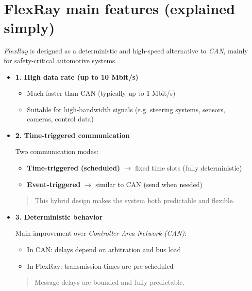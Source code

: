 \clearpage


\section{FlexRay main features (explained simply)}
\textit{FlexRay} is designed as a deterministic and high-speed alternative to \textit{CAN}, mainly for safety-critical automotive systems.

\begin{itemize}

\item \textbf{1. High data rate (up to 10 Mbit/s)}

\begin{itemize}
    \item Much faster than CAN (typically up to 1 Mbit/s)
    \item Suitable for high-bandwidth signals (e.g. steering systems, sensors, cameras, control data)
\end{itemize}

\item \textbf{2. Time-triggered communication}

Two communication modes:

\begin{itemize}
    \item \textbf{Time-triggered (scheduled)} $\rightarrow$ fixed time slots (fully deterministic)
    \item \textbf{Event-triggered} $\rightarrow$ similar to CAN (send when needed)
\end{itemize}

\begin{quote}
This hybrid design makes the system both predictable and flexible.
\end{quote}

\item \textbf{3. Deterministic behavior}

Main improvement over \textit{Controller Area Network (CAN)}:

\begin{itemize}
    \item In CAN: delays depend on arbitration and bus load
    \item In FlexRay: transmission times are pre-scheduled
\end{itemize}

\begin{quote}
Message delays are bounded and fully predictable.
\end{quote}


\end{itemize}
